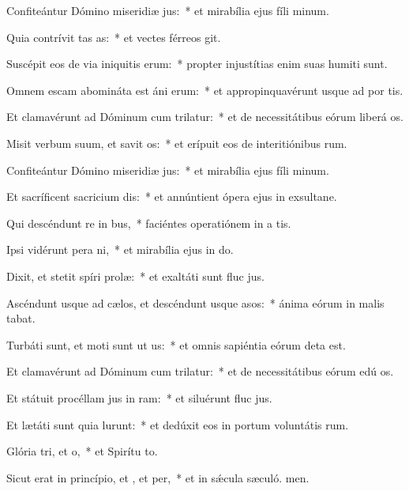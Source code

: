 \item Confiteántur Dómino miseridiæ jus:~* et mirabília ejus fíli minum.
\item Quia contrívit tas as:~* et vectes férreos git.
\item Suscépit eos de via iniquitis erum:~* propter injustítias enim suas humiti sunt.
\item Omnem escam abomináta est áni erum:~* et appropinquavérunt usque ad por tis.
\item Et clamavérunt ad Dóminum cum trilatur:~* et de necessitátibus eórum liberá os.
\item Misit verbum suum, et savit os:~* et erípuit eos de interitiónibus rum.
\item Confiteántur Dómino miseridiæ jus:~* et mirabília ejus fíli minum.
\item Et sacríficent sacricium dis:~* et annúntient ópera ejus in exsultane.
\item Qui descéndunt re in bus,~* faciéntes operatiónem in a tis.
\item Ipsi vidérunt pera ni,~* et mirabília ejus in do.
\item Dixit, et stetit spíri prolæ:~* et exaltáti sunt fluc jus.
\item Ascéndunt usque ad cælos, et descéndunt usque  asos:~* ánima eórum in malis tabat.
\item Turbáti sunt, et moti sunt ut us:~* et omnis sapiéntia eórum deta est.
\item Et clamavérunt ad Dóminum cum trilatur:~* et de necessitátibus eórum edú os.
\item Et státuit procéllam jus in ram:~* et siluérunt fluc jus.
\item Et lætáti sunt quia lurunt:~* et dedúxit eos in portum voluntátis rum.
\item Glória tri, et o,~* et Spirítu to.
\item Sicut erat in princípio, et , et per,~* et in sǽcula sæculó. men.
